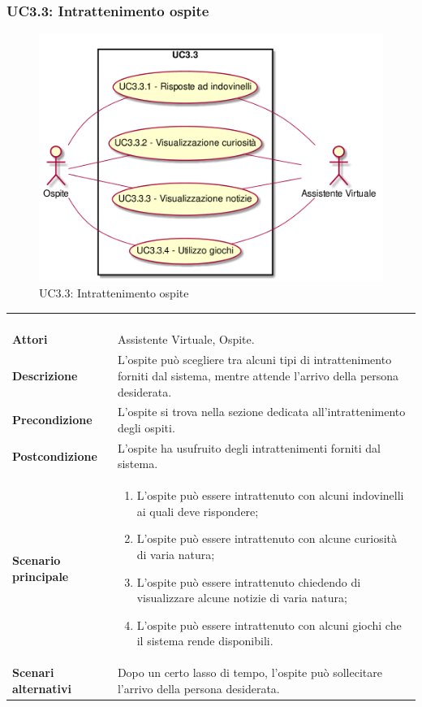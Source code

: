 \newpage\subsubsection{UC3.3: Intrattenimento ospite}
\label{UC3.3}
\begin{figure}[h]
	\centering
	\includegraphics[width=\textwidth,height=\textheight,keepaspectratio]{images/UseCaseUC33.png}
	\caption{UC3.3: Intrattenimento ospite}
\end{figure}
\begin{longtable}{l|p{10cm}}
	\rowcolor[gray]{0.8} \multicolumn{2}{c}{} \\
	\rowcolor[gray]{0.8} \multicolumn{2}{c}{\textbf{UC3.3 - Intrattenimento ospite}} \\
	\rowcolor[gray]{0.8} \multicolumn{2}{c}{} \\
	\hline
	&\\
	\textbf{Attori} & Assistente Virtuale, Ospite.\\[7pt]
	\textbf{Descrizione} & L'ospite può scegliere tra alcuni tipi di intrattenimento forniti dal sistema, mentre attende l'arrivo della persona desiderata.\\[7pt]
	\textbf{Precondizione} & L'ospite si trova nella sezione dedicata all'intrattenimento degli ospiti.\\[7pt]
	\textbf{Postcondizione} & L'ospite ha usufruito degli intrattenimenti forniti dal sistema.\\[7pt]
	\textbf{Scenario principale} &\begin{enumerate}
		\item  L'ospite può essere intrattenuto con alcuni indovinelli ai quali deve rispondere;
		\item  L'ospite può essere intrattenuto con alcune curiosità di varia natura;
		\item  L'ospite può essere intrattenuto chiedendo di visualizzare alcune notizie di varia natura;
		\item  L'ospite può essere intrattenuto con alcuni giochi che il sistema rende disponibili.
	\end{enumerate}
	\\[7pt]
	\textbf{Scenari alternativi} & Dopo un certo lasso di tempo, l'ospite può sollecitare l'arrivo della persona desiderata.\\[7pt]\hline
\end{longtable}

